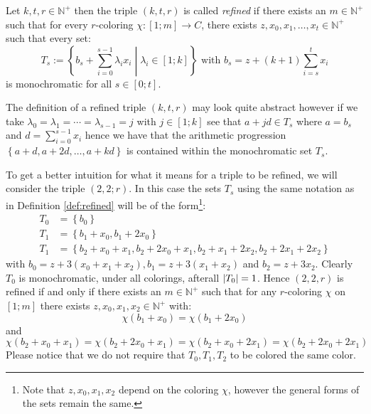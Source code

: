 \begin{definition}\label{def:refined}
	Let $k, t, r \in \mathbb{N}^{+}$ then the triple $(k, t, r)$ is called \textit{refined} if there exists an $m \in \mathbb{N}^{+}$ such that for every $r$-coloring $\chi: [1; m] \to C$, there exists $z, x_0, x_1, \ldots, x_t \in \mathbb{N}^+$ such that every set:
	\begin{equation*}
		T_s := \left\{b_{s} + \sum_{i = 0}^{s - 1} \lambda_i x_i \middle| \lambda_i \in [1; k]\right\} \text{ with }  b_s = z + (k + 1) \sum_{i = s}^t x_i
	\end{equation*}
	is monochromatic for all $s \in [0; t]$.
\end{definition}
\begin{remark}\label{rem:2.34_rtoi}
	The definition of a refined triple $(k, t, r)$ may look quite abstract however if we take $\lambda_0 = \lambda_1 = \cdots = \lambda_{s - 1} = j$ with $j \in [1; k]$ see that $a + jd \in T_{s}$ where $a = b_s$ and $d = \sum_{i = 0}^{s - 1} x_{i}$ hence we have that the arithmetic progression $\left\{a + d, a + 2d, \ldots, a + kd\right\}$ is contained within the monochromatic set $T_{s}$.
\end{remark}
\begin{example}\label{exmp:refined}
	To get a better intuition for what it means for a triple to be refined, we will consider the triple $(2, 2; r)$. In this case the sets $T_s$ using the same notation as in Definition \ref{def:refined} will be of the form\footnote{Note that $z, x_0, x_1, x_2$ depend on the coloring $\chi$, however the general forms of the sets remain the same.}:
	\begin{align*}
		T_0 & = \left\{b_0\right\}                                                                            \\
		T_1 & = \left\{b_1 + x_0, b_1 + 2x_{0}\right\}                                                        \\
		T_1 & = \left\{b_2 + x_0 + x_{1}, b_2 + 2x_{0} + x_{1}, b_2 + x_1 + 2x_2, b_{2} + 2x_1 + 2x_2\right\}
	\end{align*}
	with $b_0 = z + 3 (x_0 + x_1 + x_2), b_1 = z + 3 (x_1 + x_{2})$ and $b_2 = z + 3x_{2}$. Clearly $T_0$ is monochromatic, under all colorings, afterall $\left\lvert T_0\right\rvert = 1$. Hence $(2, 2, r)$ is refined if and only if there exists an $m \in \mathbb{N}^+$ such that for any $r$-coloring $\chi$ on $[1; m]$ there exists $z, x_0, x_1, x_2 \in \mathbb{N}^{+}$ with:
	\begin{equation*}
		\chi(b_1 + x_{0}) =  \chi(b_1 + 2x_{0})
	\end{equation*}
	and
	\begin{equation*}
		\chi(b_2 + x_0 + x_1) = \chi(b_2 + 2x_0 + x_1) = \chi(b_2 + x_0 + 2x_1) = \chi(b_2 + 2x_0 + 2x_1)
	\end{equation*}
	Please notice that we do not require that $T_0, T_1, T_2$ to be colored the same color.
\end{example}

